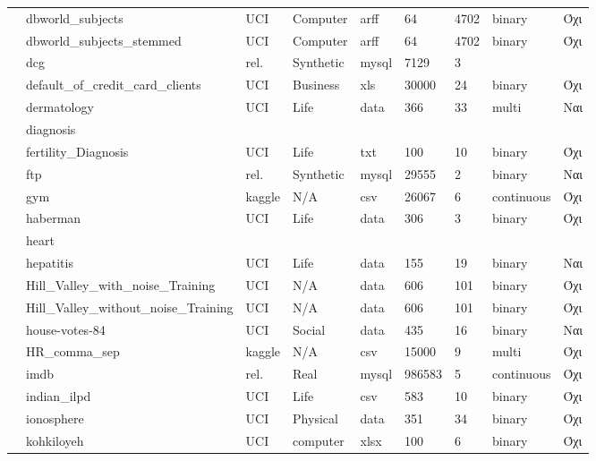 {\begin{longtable}{|l| l| l | l | l | l |l | l | l | }
 							\rownumber & dbworld\_subjects & UCI & Computer & arff & 64 & 4702 & binary & Όχι \\
 							\rownumber & dbworld\_subjects\_stemmed & UCI & Computer & arff & 64 & 4702 & binary & Όχι \\
 							\rownumber & dcg \citep{dcg} & rel. & Synthetic & mysql & 7129 & 3 & & \\
 							\rownumber & default\_of\_credit\_card\_clients \citep{default} & UCI & Business & xls & 30000 & 24 & binary & Όχι \\
 							\rownumber & dermatology \citep{dermatology} & UCI & Life & data & 366 & 33 & multi & Ναι \\
 							\rownumber & diagnosis & & & & & & & \\
 							\rownumber & fertility\_Diagnosis & UCI & Life & txt & 100 & 10 & binary & Όχι \\
 							\rownumber & ftp \citep{ftp} & rel. & Synthetic & mysql & 29555  & 2 & binary  & Ναι  \\
 							\rownumber & gym \citep{gym} & kaggle & N/A & csv & 26067 & 6 & continuous & Όχι \\
 							\rownumber & haberman \citep{haberman} & UCI & Life & data &  306 & 3 & binary & Όχι \\
 							\rownumber & heart & & & & & & & \\
 							\rownumber & hepatitis \citep{hepatitis} & UCI & Life & data & 155 & 19 & binary & Ναι \\
 							\rownumber & Hill\_Valley\_with\_noise\_Training & UCI & N/A & data & 606 & 101 & binary & Όχι \\
 							\rownumber & Hill\_Valley\_without\_noise\_Training & UCI & N/A & data & 606 & 101 & binary & Όχι \\
 							\rownumber & house-votes-84 & UCI & Social & data & 435 & 16  & binary & Ναι  \\
 							\rownumber & HR\_comma\_sep \citep{hr} & kaggle & N/A & csv & 15000 & 9 & multi & Όχι \\
 							\rownumber & imdb \citep{imdb} & rel. & Real & mysql & 986583 & 5 & continuous & Όχι \\
 							\rownumber & indian\_ilpd & UCI & Life & csv & 583 & 10 & binary & Όχι \\
 							\rownumber & ionosphere \citep{ionoshpere} & UCI & Physical & data  & 351 & 34  &  binary & Όχι \\
 							\rownumber & kohkiloyeh & UCI & computer& xlsx& 100 & 6 & binary & Όχι \\

\end{longtable}}
